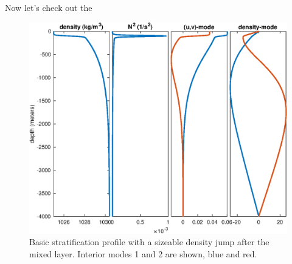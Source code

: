 \documentclass{article}
\begin{document}
Now let's check out the 

\begin{figure}
\vspace{-30pt}
    \includegraphics[width=1.0\textwidth]{ModesWithDeltaRho3}
  \caption{Basic stratification profile with a sizeable density jump after the mixed layer. Interior modes 1 and 2 are shown, blue and red.}
  \label{modes-no-deltarho}
\end{figure}


\end{document}

